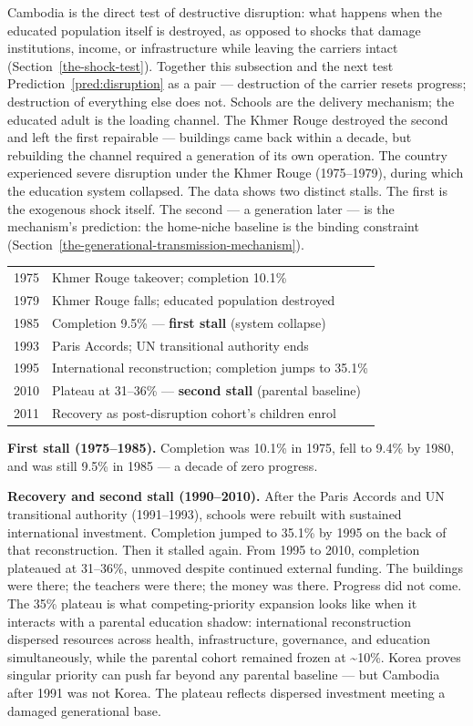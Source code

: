 \documentclass[12pt,letterpaper]{article}
\begin{document}
Cambodia is the direct test of destructive disruption: what happens
when the educated population itself is destroyed, as opposed to
shocks that damage institutions, income, or infrastructure while
leaving the carriers intact (Section~\ref{the-shock-test}). Together
this subsection and the next test
Prediction~\ref{pred:disruption} as a pair --- destruction of the
carrier resets progress; destruction of everything else does not. Schools are the
delivery mechanism; the educated adult is the loading channel. The
Khmer Rouge destroyed the second and left the first repairable ---
buildings came back within a decade, but rebuilding the channel
required a generation of its own operation. The country experienced
severe disruption under the Khmer Rouge (1975--1979), during which
the education system collapsed. The
data shows two distinct stalls. The first is the exogenous shock itself.
The second --- a generation later --- is the mechanism's prediction: the
home-niche baseline is the binding constraint (Section~\ref{the-generational-transmission-mechanism}).

\begin{center}
\small
\begin{tabular}{@{}ll@{}}
\toprule
1975 & Khmer Rouge takeover; completion 10.1\% \\
1979 & Khmer Rouge falls; educated population destroyed \\
1985 & Completion 9.5\% --- \textbf{first stall} (system collapse) \\
1993 & Paris Accords; UN transitional authority ends \\
1995 & International reconstruction; completion jumps to 35.1\% \\
2010 & Plateau at 31--36\% --- \textbf{second stall} (parental baseline) \\
2011 & Recovery as post-disruption cohort's children enrol \\
\bottomrule
\end{tabular}
\end{center}

\textbf{First stall (1975--1985).} Completion was 10.1\% in 1975, fell to 9.4\% by 1980, and was still 9.5\% in 1985 --- a decade of zero progress.

\textbf{Recovery and second stall (1990--2010).} After the Paris Accords
and UN transitional authority (1991--1993), schools were rebuilt with
sustained international investment. Completion jumped to 35.1\% by 1995
on the back of that reconstruction. Then it stalled again. From 1995 to
2010, completion plateaued at 31--36\%, unmoved despite continued
external funding. The buildings were there; the teachers were there; the
money was there. Progress did not come. The 35\% plateau is what
competing-priority expansion looks like when it interacts with a
parental education shadow: international reconstruction dispersed
resources across health, infrastructure, governance, and education
simultaneously, while the parental cohort remained frozen at
\textasciitilde10\%. Korea proves singular priority can push far beyond
any parental baseline --- but Cambodia after 1991 was not Korea. The
plateau reflects dispersed investment meeting a damaged generational
base.
\end{document}
